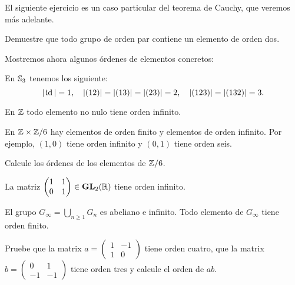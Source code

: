 El siguiente ejercicio es un caso particular del teorema de Cauchy, que veremos más adelante. 

\begin{exercise}
\label{xca:orden2}
Demuestre que todo grupo de orden par contiene un elemento de orden dos. 	
\end{exercise}

Mostremos ahora algunos órdenes de elementos concretos: 

\begin{example}
En $\mathbb{S}_3$ tenemos los siguiente:
\[
|\operatorname{id}|=1,\quad
|(12)|=|(13)|=|(23)|=2,\quad
|(123)|=|(132)|=3.
\]	
\end{example}

\begin{example}
En $\mathbb{Z}$ todo elemento no nulo tiene orden infinito.	
\end{example}

\begin{example}
En $\mathbb{Z}\times\mathbb{Z}/6$ hay elementos de orden finito y elementos de orden infinito. Por ejemplo, $(1,0)$ tiene orden infinito y 
$(0,1)$ tiene orden seis. 
\end{example}

\begin{exercise}
Calcule los órdenes de los elementos de $\mathbb{Z}/6$.	
\end{exercise}

\begin{example}
La matriz $\begin{pmatrix}1&1\\0&1\end{pmatrix}\in\mathbf{GL}_2(\mathbb{R})$ tiene orden infinito. 
\end{example}

\begin{example}
El grupo $G_\infty=\bigcup_{n\geq1}G_n$ es abeliano e infinito. Todo elemento de $G_\infty$ tiene orden finito. 
\end{example}

\begin{exercise}
Pruebe que la matrix $a=\begin{pmatrix}1&-1\\1&0\end{pmatrix}$ tiene orden cuatro, que la matrix $b=\begin{pmatrix}0&1\\-1&-1\end{pmatrix}$ tiene orden tres
y calcule el orden de $ab$.%
\end{exercise}

